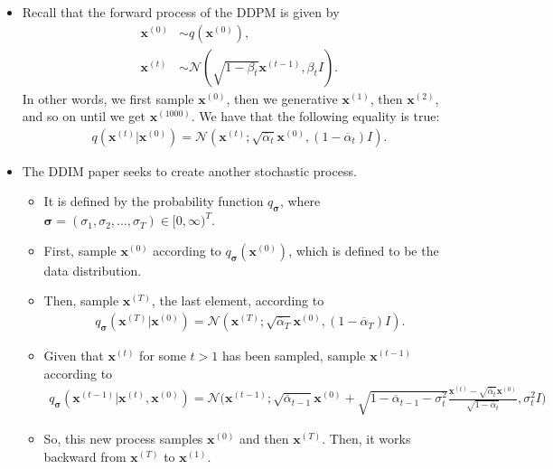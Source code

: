 \documentclass[10pt]{article}
\newcommand{\ve}[1]{\mathbf{#1}}
\newcommand{\ves}[1]{\boldsymbol{#1}}
\newcommand{\mcal}[1]{\mathcal{#1}}
\begin{document}
\begin{itemize}
  \item Recall that the forward process of the DDPM is given by
  \begin{align*}
    \ve{x}^{(0)} &\sim q(\ve{x}^{(0)}),\\
    \ve{x}^{(t)} &\sim \mcal{N}(\sqrt{1 - \beta_t} \ve{x}^{(t-1)}, \beta_t I).
  \end{align*}
  In other words, we first sample $\ve{x}^{(0)}$, then we generative $\ve{x}^{(1)}$, then $\ve{x}^{(2)}$, and so on until we get $\ve{x}^{(1000)}$. We have that the following equality is true:
  \begin{align*}
    q(\ve{x}^{(t)}|\ve{x}^{(0)}) = \mcal{N}(\ve{x}^{(t)}; \sqrt{\overline{\alpha}_t}\ve{x}^{(0)}, (1 - \overline{\alpha}_t) I).
  \end{align*}

  \item The DDIM paper seeks to create another stochastic process.
  \begin{itemize}
    \item It is defined by the probability function $q_{\ves{\sigma}}$, where $\ves{\sigma} = (\sigma_1, \sigma_2, \dotsc, \sigma_T) \in [0,\infty)^T$.
    \item First, sample $\ve{x}^{(0)}$ according to $q_{\ves{\sigma}}(\ve{x}^{(0)})$, which is defined to be the data distribution.
    \item Then, sample $\ve{x}^{(T)}$, the last element, according to
    \begin{align*}
      q_{\ves{\sigma}}(\ve{x}^{(T)}|\ve{x}^{(0)}) = \mcal{N}(\ve{x}^{(T)}; \sqrt{\overline{\alpha}_T}\ve{x}^{(0)}, (1 - \overline{\alpha}_T) I).
    \end{align*}
    \item Given that $\ve{x}^{(t)}$ for some $t > 1$ has been sampled, sample $\ve{x}^{(t-1)}$ according to
    \begin{align*}
      q_{\ves{\sigma}}(\ve{x}^{(t-1)}|\ve{x}^{(t)}, \ve{x}^{(0)}) = \mcal{N}\bigg( \ve{x}^{(t-1)} ; \sqrt{\overline{\alpha}_{t-1}} \ve{x}^{(0)} + \sqrt{1 - \overline{\alpha}_{t-1} - \sigma_t^2 } \frac{\ve{x}^{(t)} - \sqrt{\overline{\alpha}_t} \ve{x}^{(0)}}{\sqrt{1 - \overline{\alpha}_t}}, \sigma_t^2 I \bigg)
    \end{align*}
    \item So, this new process samples $\ve{x}^{(0)}$ and then $\ve{x}^{(T)}$. Then, it works backward from $\ve{x}^{(T)}$ to $\ve{x}^{(1)}$.
  \end{itemize}


\end{itemize}
\end{document}
